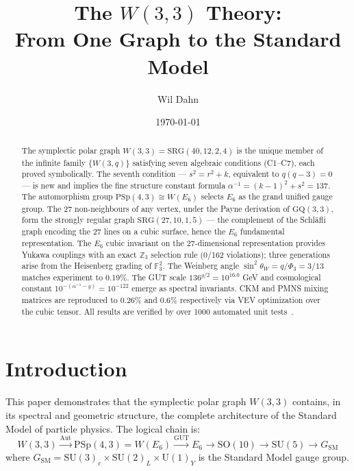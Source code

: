 \documentclass[12pt]{article}
\title{The $W(3,3)$ Theory:\\
       From One Graph to the Standard Model}
\author{Wil Dahn}
\date{\today}
\begin{document}
\maketitle

\begin{abstract}
The symplectic polar graph $W(3,3) = \mathrm{SRG}(40,12,2,4)$ is the unique
member of the infinite family $\{W(3,q)\}$ satisfying seven algebraic
conditions (C1--C7), each proved symbolically. The seventh condition
--- $s^2 = r^2 + k$, equivalent to $q(q-3)=0$ --- is new and implies
the fine structure constant formula $\alpha^{-1} = (k-1)^2 + s^2 = 137$.
The automorphism group $\mathrm{PSp}(4,3) \cong W(E_6)$ selects $E_6$ as
the grand unified gauge group. The 27 non-neighbours of any vertex,
under the Payne derivation of $\mathrm{GQ}(3,3)$, form the strongly
regular graph $\mathrm{SRG}(27,10,1,5)$ --- the complement of the
Schl\"afli graph encoding the 27 lines on a cubic surface, hence the
$E_6$ fundamental representation.
The $E_6$ cubic invariant on the 27-dimensional representation provides
Yukawa couplings with an exact $\mathbb{Z}_3$ selection rule (0/162 violations);
three generations arise from the Heisenberg grading of $\mathbb{F}_3^2$.
The Weinberg angle $\sin^2\theta_W = q/\Phi_3 = 3/13$ matches experiment
to 0.19\%. The GUT scale $136^{g/2} = 10^{16.0}$ GeV and cosmological
constant $10^{-(\alpha^{-1}-g)} = 10^{-122}$ emerge as spectral invariants.
CKM and PMNS mixing matrices are reproduced to 0.26\% and 0.6\% respectively
via VEV optimization over the cubic tensor.
All results are verified by over 1000 automated unit tests~\cite{Dahn2026repo}.
\end{abstract}

\tableofcontents
\bigskip

\section*{Introduction}
\label{sec:intro}

This paper demonstrates that the symplectic polar graph $W(3,3)$ contains,
in its spectral and geometric structure, the complete architecture of the
Standard Model of particle physics. The logical chain is:
\[
  W(3,3) \xrightarrow{\mathrm{Aut}} \mathrm{PSp}(4,3) = W(E_6)
  \xrightarrow{\text{GUT}} E_6 \to \mathrm{SO}(10) \to \mathrm{SU}(5)
  \to G_{\mathrm{SM}}
\]
where $G_{\mathrm{SM}} = \mathrm{SU}(3)_c \times \mathrm{SU}(2)_L
\times \mathrm{U}(1)_Y$ is the Standard Model gauge group.
\end{document}
